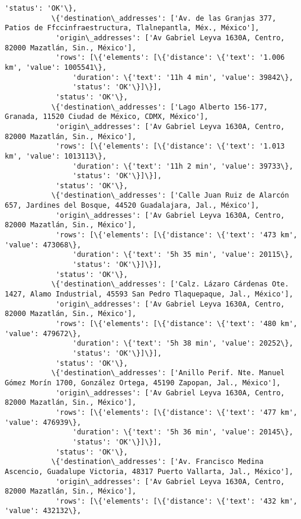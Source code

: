 \documentclass[11pt]{article}
\begin{document}
\begin{Verbatim}[commandchars=\\\{\}]
            'status': 'OK'\},
           \{'destination\_addresses': ['Av. de las Granjas 377, Patios de Ffccinfraestructura, Tlalnepantla, Méx., México'],
            'origin\_addresses': ['Av Gabriel Leyva 1630A, Centro, 82000 Mazatlán, Sin., México'],
            'rows': [\{'elements': [\{'distance': \{'text': '1.006 km', 'value': 1005541\},
                'duration': \{'text': '11h 4 min', 'value': 39842\},
                'status': 'OK'\}]\}],
            'status': 'OK'\},
           \{'destination\_addresses': ['Lago Alberto 156-177, Granada, 11520 Ciudad de México, CDMX, México'],
            'origin\_addresses': ['Av Gabriel Leyva 1630A, Centro, 82000 Mazatlán, Sin., México'],
            'rows': [\{'elements': [\{'distance': \{'text': '1.013 km', 'value': 1013113\},
                'duration': \{'text': '11h 2 min', 'value': 39733\},
                'status': 'OK'\}]\}],
            'status': 'OK'\},
           \{'destination\_addresses': ['Calle Juan Ruiz de Alarcón 657, Jardines del Bosque, 44520 Guadalajara, Jal., México'],
            'origin\_addresses': ['Av Gabriel Leyva 1630A, Centro, 82000 Mazatlán, Sin., México'],
            'rows': [\{'elements': [\{'distance': \{'text': '473 km', 'value': 473068\},
                'duration': \{'text': '5h 35 min', 'value': 20115\},
                'status': 'OK'\}]\}],
            'status': 'OK'\},
           \{'destination\_addresses': ['Calz. Lázaro Cárdenas Ote. 1427, Alamo Industrial, 45593 San Pedro Tlaquepaque, Jal., México'],
            'origin\_addresses': ['Av Gabriel Leyva 1630A, Centro, 82000 Mazatlán, Sin., México'],
            'rows': [\{'elements': [\{'distance': \{'text': '480 km', 'value': 479672\},
                'duration': \{'text': '5h 38 min', 'value': 20252\},
                'status': 'OK'\}]\}],
            'status': 'OK'\},
           \{'destination\_addresses': ['Anillo Perif. Nte. Manuel Gómez Morín 1700, González Ortega, 45190 Zapopan, Jal., México'],
            'origin\_addresses': ['Av Gabriel Leyva 1630A, Centro, 82000 Mazatlán, Sin., México'],
            'rows': [\{'elements': [\{'distance': \{'text': '477 km', 'value': 476939\},
                'duration': \{'text': '5h 36 min', 'value': 20145\},
                'status': 'OK'\}]\}],
            'status': 'OK'\},
           \{'destination\_addresses': ['Av. Francisco Medina Ascencio, Guadalupe Victoria, 48317 Puerto Vallarta, Jal., México'],
            'origin\_addresses': ['Av Gabriel Leyva 1630A, Centro, 82000 Mazatlán, Sin., México'],
            'rows': [\{'elements': [\{'distance': \{'text': '432 km', 'value': 432132\},

\end{Verbatim}
\end{document}
